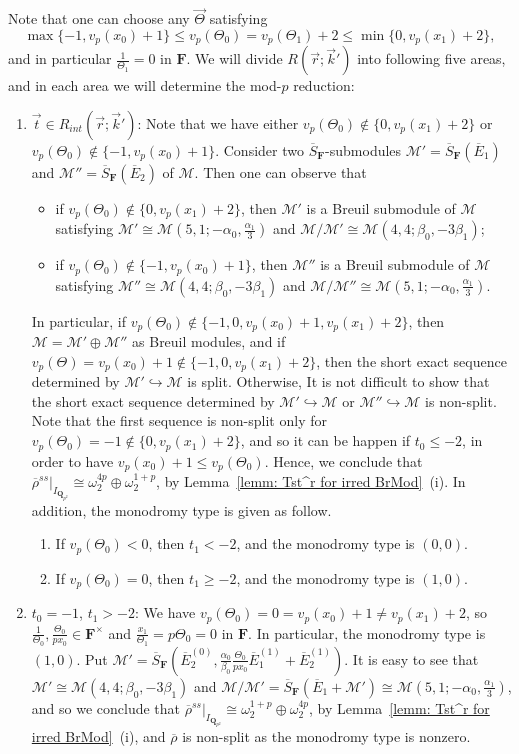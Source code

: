 \documentclass[11pt]{amsart}
\theoremstyle{definition}
\numberwithin{equation}{subsection}
\theoremstyle{plain}
\theoremstyle{plain}
\theoremstyle{plain}
\theoremstyle{plain}
\theoremstyle{plain}
\theoremstyle{plain}
\theoremstyle{plain}
\theoremstyle{plain}
\theoremstyle{plain}
\theoremstyle{plain}
\theoremstyle{plain}
\theoremstyle{plain}
\theoremstyle{definition}
\theoremstyle{definition}
\theoremstyle{definition}
\theoremstyle{remark}
\renewcommand{\(}{\textup{(}}
\renewcommand{\)}{\textup{)}}
\newcommand{\Q}{\mathbf{Q}}
\newcommand{\F}{\mathbf{F}}
\newcommand{\barS}{\overline{S}}
\newcommand{\rhobar}{\overline{\rho}}
\newcommand{\cM}{\mathcal{M}}
\newcommand{\barE}{\overline{E}}
\newcommand{\vr}{\vec{r}}
\newcommand{\vk}{\vec{k}}
\newcommand{\vTh}{\vec{\Theta}}
\newcommand{\IQptwo}{{I_{\Q_{p^2}}}}
\begin{document}
Note that one can choose any $\vTh$ satisfying
$$\max\{-1, v_p(x_0)+1\}\leq v_p(\Theta_0)=v_p(\Theta_1)+2\leq \min\{0,v_p(x_1)+2\},$$
and in particular $\frac{1}{\Theta_1}=0$ in $\F$. We will divide $R(\vr;\vk')$ into following five areas, and in each area we will determine the mod-$p$ reduction:
\begin{enumerate}[leftmargin=*]
  \item $\vec{t}\in R_{int}(\vr;\vk')$: Note that we have either $v_p(\Theta_0)\not\in\{0,v_p(x_1)+2\}$ or $v_p(\Theta_0)\not\in\{-1,v_p(x_0)+1\}$. Consider two $\barS_{\F}$-submodules $\cM'=\barS_{\F}(\barE_1)$ and $\cM''=\barS_{\F}(\barE_2)$ of $\cM$. Then one can observe that
    \begin{itemize}[leftmargin=*]
      \item if $v_p(\Theta_0)\not\in\{ 0,v_p(x_1)+2\}$, then $\cM'$ is a Breuil submodule of $\cM$ satisfying $\cM'\cong\cM(5,1;-\alpha_0,\frac{\alpha_1}{3})$ and $\cM/\cM'\cong\cM(4,4;\beta_0,-3\beta_1)$;
      \item if $v_p(\Theta_0)\not\in\{ -1,v_p(x_0)+1\}$, then $\cM''$ is a Breuil submodule of $\cM$ satisfying $\cM''\cong\cM(4,4;\beta_0,-3\beta_1)$ and $\cM/\cM''\cong\cM(5,1;-\alpha_0,\frac{\alpha_1}{3})$.
    \end{itemize}
    In particular, if $v_p(\Theta_0)\not\in\{-1,0,v_p(x_0)+1,v_p(x_1)+2\}$, then $\cM=\cM'\oplus\cM''$ as Breuil modules, and if $v_p(\Theta)=v_p(x_0)+1\not\in\{-1,0,v_p(x_1)+2\}$, then the short exact sequence determined by $\cM'\hookrightarrow\cM$ is split. Otherwise, It is not difficult to show that the short exact sequence determined by $\cM'\hookrightarrow \cM$ or $\cM''\hookrightarrow\cM$ is non-split. Note that the first sequence is non-split only for 
    $v_p(\Theta_0)=-1\not\in\{0,v_p(x_1)+2\}$, and so it can be happen if $t_0\leq -2$, in order to have $v_p(x_0)+1\leq v_p(\Theta_0)$. Hence, we conclude that $\rhobar^{ss}|_\IQptwo\cong\omega_2^{4p}\oplus\omega_2^{1+p}$, by Lemma~\ref{lemm: Tst^r for irred BrMod}~(i). In addition, the monodromy type is given as follow.
    \begin{enumerate}[leftmargin=*]
      \item If $v_p(\Theta_0)<0$, then $t_1<-2$, and the monodromy type is $(0,0)$.
      \item If $v_p(\Theta_0)=0$, then $t_1\geq -2$, and the monodromy type is $(1,0)$.
    \end{enumerate}
  \item $t_0=-1$, $t_1>-2$: We have $v_p(\Theta_0)=0=v_p(x_0)+1\neq v_p(x_1)+2$, so $\frac{1}{\Theta_0},\frac{\Theta_0}{px_0}\in\F^\times$ and $\frac{x_1}{\Theta_1}=p\Theta_0=0$ in $\F$. In particular, the monodromy type is $(1,0)$. Put $\cM'=\barS_{\F}(\barE_2^{(0)},\frac{\alpha_0}{\beta_0}\frac{\Theta_0}{px_0}\barE_1^{(1)}+\barE_2^{(1)})$. It is easy to see that $\cM'\cong\cM(4,4;\beta_0,-3\beta_1)$ and $\cM/\cM'=\barS_{\F}(\barE_1+\cM')\cong\cM(5,1;-\alpha_0,\frac{\alpha_1}{3})$, and so we conclude that $\rhobar^{ss}|_\IQptwo\cong\omega_2^{1+p}\oplus\omega_2^{4p}$, by Lemma~\ref{lemm: Tst^r for irred BrMod}~(i), and $\rhobar$ is non-split as the monodromy type is nonzero.

\end{enumerate}
\end{document}
